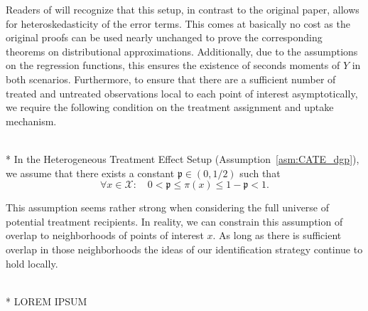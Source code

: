 Readers of \citet{demirkaya_optimal_2024} will recognize that this setup, in contrast to the original paper, allows for heteroskedasticity of the error terms.
This comes at basically no cost as the original proofs can be used nearly unchanged to prove the corresponding theorems on distributional approximations.
Additionally, due to the assumptions on the regression functions, this ensures the existence of seconds moments of $Y$ in both scenarios.
Furthermore, to ensure that there are a sufficient number of treated and untreated observations local to each point of interest asymptotically, we require the following condition on the treatment assignment and uptake mechanism.
\begin{boxD}
	\begin{asm}\label{asm:treatment_overlap}\mbox{}\\*
		In the Heterogeneous Treatment Effect Setup (Assumption~\ref{asm:CATE_dgp}), we assume that there exists a constant $\mathfrak{p} \in (0, 1/2)$ such that
		\begin{equation}
			\forall x \in \mathcal{X}: \quad 
			0 < \mathfrak{p} \leq \pi\left(x\right) \leq 1 - \mathfrak{p} < 1.
		\end{equation}
	\end{asm}
\end{boxD}
This assumption seems rather strong when considering the full universe of potential treatment recipients.
In reality, we can constrain this assumption of overlap to neighborhoods of points of interest $x$.
As long as there is sufficient overlap in those neighborhoods the ideas of our identification strategy continue to hold locally.
\begin{boxE}
    \addtocounter{exmp}{-1}
    \begin{exmp}\mbox{}\\*
        {\color{red} LOREM IPSUM}
    \end{exmp}    
\end{boxE}

